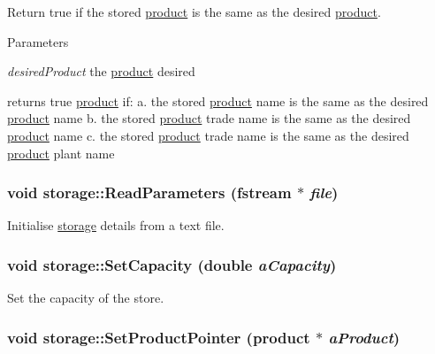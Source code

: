 Return true if the stored \hyperlink{classproduct}{product} is the same as the desired \hyperlink{classproduct}{product}. 
\begin{DoxyParams}{Parameters}
\item[{\em desiredProduct}]the \hyperlink{classproduct}{product} desired\end{DoxyParams}
returns true \hyperlink{classproduct}{product} if: a. the stored \hyperlink{classproduct}{product} name is the same as the desired \hyperlink{classproduct}{product} name b. the stored \hyperlink{classproduct}{product} trade name is the same as the desired \hyperlink{classproduct}{product} name c. the stored \hyperlink{classproduct}{product} trade name is the same as the desired \hyperlink{classproduct}{product} plant name \hypertarget{classstorage_a1dd69d2a46fa8359198d8c9d609ce50b}{
\subsubsection[{ReadParameters}]{\setlength{\rightskip}{0pt plus 5cm}void storage::ReadParameters (fstream $\ast$ {\em file})}}
\label{classstorage_a1dd69d2a46fa8359198d8c9d609ce50b}


Initialise \hyperlink{classstorage}{storage} details from a text file. \hypertarget{classstorage_ac943ca0d285591334ab8808d703aa106}{
\subsubsection[{SetCapacity}]{\setlength{\rightskip}{0pt plus 5cm}void storage::SetCapacity (double {\em aCapacity})}}
\label{classstorage_ac943ca0d285591334ab8808d703aa106}


Set the capacity of the store. \hypertarget{classstorage_ad93983f9383bf81f369ed75f2e9fa1d2}{
\subsubsection[{SetProductPointer}]{\setlength{\rightskip}{0pt plus 5cm}void storage::SetProductPointer ({\bf product} $\ast$ {\em aProduct})}}
\label{classstorage_ad93983f9383bf81f369ed75f2e9fa1d2}



